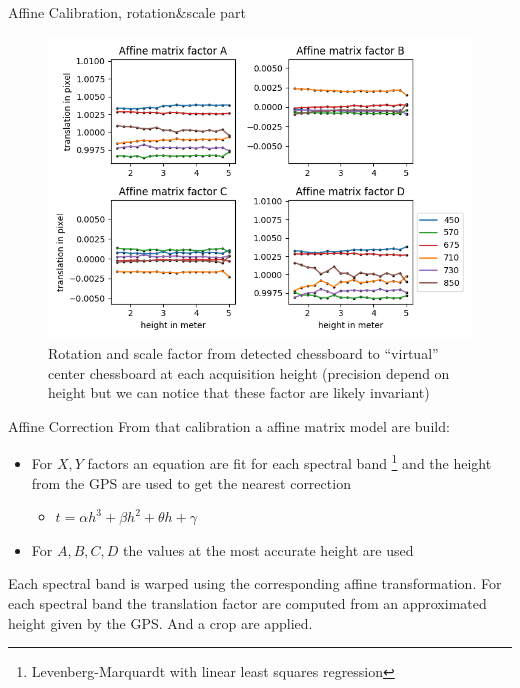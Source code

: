 \documentclass{beamer}
\begin{document}
		\begin{frame}{Affine Calibration, rotation\&scale part}
			\begin{figure}
				\includegraphics[width=0.7\linewidth]{../figures/affine-rotation-height.png}
				\caption{Rotation and scale factor from detected chessboard to ``virtual'' center chessboard at each acquisition height (precision depend on height but we can notice that these factor are likely invariant)}
			\end{figure}
		\end{frame}
	
		\begin{frame}{Affine Correction}
			From that calibration a affine matrix model are build:
			
			\begin{itemize}
				\item For $X,Y$ factors an equation are fit for each spectral band \footnote{Levenberg-Marquardt with linear least squares regression} and the height from the GPS are used to get the nearest correction
				\begin{itemize}
					\item $t = \alpha h^3 + \beta h^2 + \theta h + \gamma$
				\end{itemize}
				\item For $A,B,C,D$ the values at the most accurate height are used
			\end{itemize}
		
			Each spectral band is warped using the corresponding affine transformation.
			For each spectral band the translation factor are computed from an approximated height given by the GPS.
			And a crop are applied.
		\end{frame}
	
\end{document}
